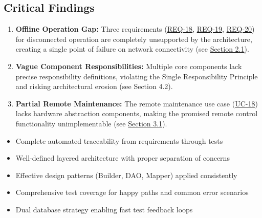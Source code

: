 \documentclass[11pt,a4paper]{article}
\begin{document}
\subsection{Critical Findings}

\begin{tcolorbox}[colback=criticalred!5,colframe=criticalred,title=\textbf{Critical Issues Requiring Immediate Attention}]
\begin{enumerate}
    \item \textbf{Offline Operation Gap:} Three requirements (\hyperref[req:offline-tracking]{REQ-18}, \hyperref[req:offline-sync]{REQ-19}, \hyperref[req:offline-cash]{REQ-20}) for disconnected operation are completely unsupported by the architecture, creating a single point of failure on network connectivity (see \hyperref[sec:offline-gap]{Section 2.1}).

    \item \textbf{Vague Component Responsibilities:} Multiple core components lack precise responsibility definitions, violating the Single Responsibility Principle and risking architectural erosion (see Section 4.2).

    \item \textbf{Partial Remote Maintenance:} The remote maintenance use case (\hyperref[uc:remote-maintenance]{UC-18}) lacks hardware abstraction components, making the promised remote control functionality unimplementable (see \hyperref[sec:uc-gaps]{Section 3.1}).
\end{enumerate}
\end{tcolorbox}

\begin{tcolorbox}[colback=strengthgreen!5,colframe=strengthgreen,title=\textbf{Architectural Strengths}]
\begin{itemize}[leftmargin=*]
    \item Complete automated traceability from requirements through tests
    \item Well-defined layered architecture with proper separation of concerns
    \item Effective design patterns (Builder, DAO, Mapper) applied consistently
    \item Comprehensive test coverage for happy paths and common error scenarios
    \item Dual database strategy enabling fast test feedback loops
\end{itemize}
\end{tcolorbox}

\end{document}
